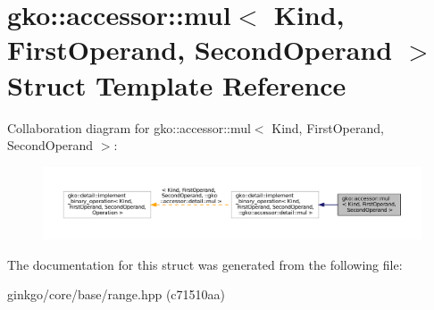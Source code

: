 \hypertarget{structgko_1_1accessor_1_1mul}{}\section{gko\+:\+:accessor\+:\+:mul$<$ Kind, First\+Operand, Second\+Operand $>$ Struct Template Reference}
\label{structgko_1_1accessor_1_1mul}


Collaboration diagram for gko\+:\+:accessor\+:\+:mul$<$ Kind, First\+Operand, Second\+Operand $>$\+:
\nopagebreak
\begin{figure}[H]
\begin{center}
\leavevmode
\includegraphics[width=350pt]{structgko_1_1accessor_1_1mul__coll__graph}
\end{center}
\end{figure}


The documentation for this struct was generated from the following file\+:\begin{DoxyCompactItemize}
\item 
ginkgo/core/base/range.\+hpp (c71510aa)\end{DoxyCompactItemize}
